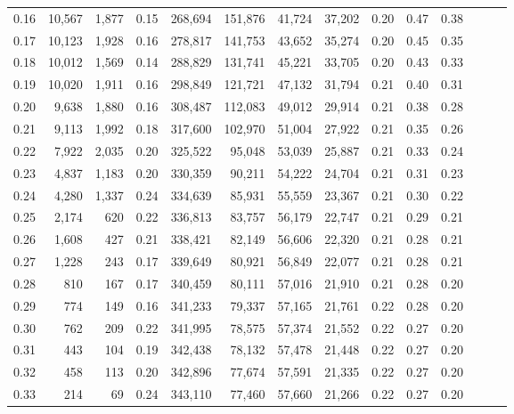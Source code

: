 \begin{tabular}{rrrrrrrrrrrrrr}
0.16 &  10,567 &  1,877 &  0.15 &  268,694 &  151,876 &  41,724 &  37,202 &  0.20 &  0.47 &      0.38 \\
0.17 &  10,123 &  1,928 &  0.16 &  278,817 &  141,753 &  43,652 &  35,274 &  0.20 &  0.45 &      0.35 \\
0.18 &  10,012 &  1,569 &  0.14 &  288,829 &  131,741 &  45,221 &  33,705 &  0.20 &  0.43 &      0.33 \\
0.19 &  10,020 &  1,911 &  0.16 &  298,849 &  121,721 &  47,132 &  31,794 &  0.21 &  0.40 &      0.31 \\
0.20 &   9,638 &  1,880 &  0.16 &  308,487 &  112,083 &  49,012 &  29,914 &  0.21 &  0.38 &      0.28 \\
0.21 &   9,113 &  1,992 &  0.18 &  317,600 &  102,970 &  51,004 &  27,922 &  0.21 &  0.35 &      0.26 \\
0.22 &   7,922 &  2,035 &  0.20 &  325,522 &   95,048 &  53,039 &  25,887 &  0.21 &  0.33 &      0.24 \\
0.23 &   4,837 &  1,183 &  0.20 &  330,359 &   90,211 &  54,222 &  24,704 &  0.21 &  0.31 &      0.23 \\
0.24 &   4,280 &  1,337 &  0.24 &  334,639 &   85,931 &  55,559 &  23,367 &  0.21 &  0.30 &      0.22 \\
0.25 &   2,174 &    620 &  0.22 &  336,813 &   83,757 &  56,179 &  22,747 &  0.21 &  0.29 &      0.21 \\
0.26 &   1,608 &    427 &  0.21 &  338,421 &   82,149 &  56,606 &  22,320 &  0.21 &  0.28 &      0.21 \\
0.27 &   1,228 &    243 &  0.17 &  339,649 &   80,921 &  56,849 &  22,077 &  0.21 &  0.28 &      0.21 \\
0.28 &     810 &    167 &  0.17 &  340,459 &   80,111 &  57,016 &  21,910 &  0.21 &  0.28 &      0.20 \\
0.29 &     774 &    149 &  0.16 &  341,233 &   79,337 &  57,165 &  21,761 &  0.22 &  0.28 &      0.20 \\
0.30 &     762 &    209 &  0.22 &  341,995 &   78,575 &  57,374 &  21,552 &  0.22 &  0.27 &      0.20 \\
0.31 &     443 &    104 &  0.19 &  342,438 &   78,132 &  57,478 &  21,448 &  0.22 &  0.27 &      0.20 \\
0.32 &     458 &    113 &  0.20 &  342,896 &   77,674 &  57,591 &  21,335 &  0.22 &  0.27 &      0.20 \\
0.33 &     214 &     69 &  0.24 &  343,110 &   77,460 &  57,660 &  21,266 &  0.22 &  0.27 &      0.20 \\

\end{tabular}
